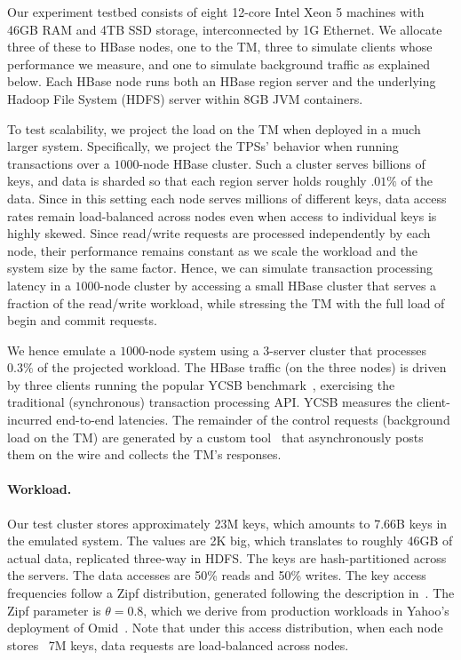 Our experiment testbed consists of eight 12-core Intel Xeon 5 machines with 46GB RAM and 4TB 
SSD storage, interconnected by 1G Ethernet. We allocate three of these to HBase nodes, 
one to the TM,
three to simulate clients whose performance we measure, and one to simulate background traffic
as explained below. 
Each HBase node runs both an HBase region server and the underlying 
Hadoop File System (HDFS) server within 8GB JVM containers. 

To test scalability, we project the load on the TM when deployed in a much larger system. 
Specifically, we project the TPSs' behavior when running transactions over a $1000$-node HBase cluster.
Such a cluster serves billions of keys, and data is sharded so that each region server 
holds roughly $.01\%$ of the data.
Since in this setting each node serves millions of different keys, 
data access rates remain load-balanced across nodes 
even when access to individual keys is highly skewed. 
Since read/write requests are processed independently by each node, 
their performance remains constant as we scale the workload and the 
system size by the same factor. 
Hence, we can simulate transaction processing latency in 
a $1000$-node cluster
by accessing a small HBase cluster that serves a fraction of the read/write workload, 
while stressing the TM with the full load of begin and commit requests. 

We hence emulate a $1000$-node system using a $3$-server cluster that processes $0.3\%$ of the projected workload. 
The HBase traffic (on the three nodes) is driven by three clients running the popular YCSB benchmark~\cite{Cooper:2010:BCS:1807128.1807152}, 
exercising the traditional (synchronous) transaction processing API. YCSB measures the client-incurred end-to-end latencies.
The remainder of the control requests (background load on the TM) are generated by a custom tool~\cite{Omid2017} 
that asynchronously posts them on the wire and collects the TM's responses. 

\paragraph{Workload.}

Our test cluster stores approximately 23M keys, which amounts to 7.66B keys in the emulated system. 
The values are 2K big, which translates to roughly 46GB of actual data, replicated three-way in HDFS. The keys are hash-partitioned
across the servers. The data accesses are 50\% reads and 
50\% writes. The key access frequencies follow a Zipf distribution, generated following 
the description in~\cite{Gray:1994:QGB:191839.191886}. The Zipf parameter is $\theta=0.8$, which we derive from production 
workloads in Yahoo's deployment of Omid~\cite{Omid2017}. 
Note that under this access distribution, when each node stores ~7M keys, data requests are load-balanced across nodes.

